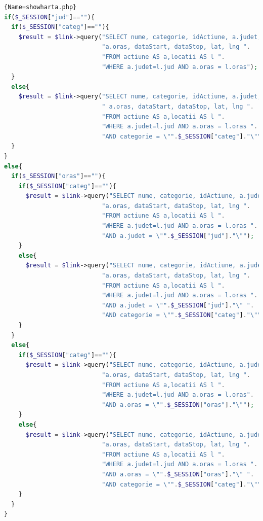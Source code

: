\documentclass[12pt,a4paper]{report}
\begin{document}
\begin{lstlisting}[basicstyle=\small, language=PHP]{Name=showharta.php}
if($_SESSION["jud"]==""){
  if($_SESSION["categ"]==""){
    $result = $link->query("SELECT nume, categorie, idActiune, a.judet,".
                           "a.oras, dataStart, dataStop, lat, lng ".
                           "FROM actiune AS a,locatii AS l ".
                           "WHERE a.judet=l.jud AND a.oras = l.oras");
  }
  else{
    $result = $link->query("SELECT nume, categorie, idActiune, a.judet,".
                           " a.oras, dataStart, dataStop, lat, lng ".
                           "FROM actiune AS a,locatii AS l ".
                           "WHERE a.judet=l.jud AND a.oras = l.oras ".
                           "AND categorie = \"".$_SESSION["categ"]."\"");
  }
}
else{
  if($_SESSION["oras"]==""){
    if($_SESSION["categ"]==""){
      $result = $link->query("SELECT nume, categorie, idActiune, a.judet,".
                           "a.oras, dataStart, dataStop, lat, lng ".
                           "FROM actiune AS a,locatii AS l ".
                           "WHERE a.judet=l.jud AND a.oras = l.oras ".
                           "AND a.judet = \"".$_SESSION["jud"]."\"");
    }
    else{
      $result = $link->query("SELECT nume, categorie, idActiune, a.judet,".
                           "a.oras, dataStart, dataStop, lat, lng ".
                           "FROM actiune AS a,locatii AS l ".
                           "WHERE a.judet=l.jud AND a.oras = l.oras ".
                           "AND a.judet = \"".$_SESSION["jud"]."\" ".
                           "AND categorie = \"".$_SESSION["categ"]."\"");
    }
  }
  else{
    if($_SESSION["categ"]==""){
      $result = $link->query("SELECT nume, categorie, idActiune, a.judet,".
                           "a.oras, dataStart, dataStop, lat, lng ".
                           "FROM actiune AS a,locatii AS l ".
                           "WHERE a.judet=l.jud AND a.oras = l.oras".
                           "AND a.oras = \"".$_SESSION["oras"]."\"");
    }
    else{
      $result = $link->query("SELECT nume, categorie, idActiune, a.judet,".
                           "a.oras, dataStart, dataStop, lat, lng ".
                           "FROM actiune AS a,locatii AS l ".
                           "WHERE a.judet=l.jud AND a.oras = l.oras ".
                           "AND a.oras = \"".$_SESSION["oras"]."\" ".
                           "AND categorie = \"".$_SESSION["categ"]."\"");
    }
  }
}
\end{lstlisting}
\end{document}

